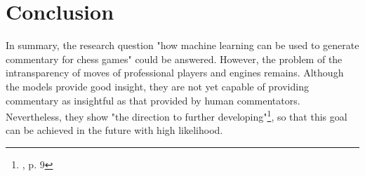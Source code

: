 \section{Conclusion}

In summary, the research question "how machine learning can be used to generate commentary for chess games" could be answered. However, the problem of the intransparency of moves of professional players and engines remains. Although the models provide good insight, they are not yet capable of providing commentary as insightful as that provided by human commentators. Nevertheless, they show "the direction to further developing"\footnote{\cite{zang-etal-2019-automated}, p. 9}, so that this goal can be achieved in the future with high likelihood. 